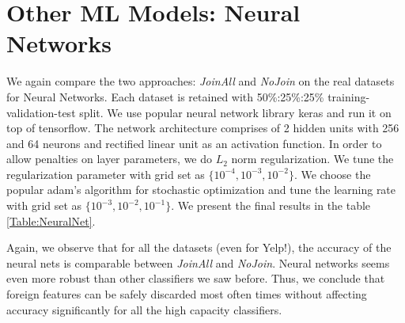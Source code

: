 \documentclass{vldb}
\begin{document}
\section{Other ML Models: Neural Networks}
We again compare the two approaches: \textit{JoinAll} and \textit{NoJoin} on the real datasets for Neural Networks. Each dataset is retained with 50\%:25\%:25\% training-validation-test split. We use popular neural network library keras and run it on top of tensorflow. The network architecture comprises of 2 hidden units with 256 and 64 neurons and rectified linear unit as an activation function. In order to allow penalties on layer parameters, we do $L_2$ norm regularization. We tune the regularization parameter with grid set as $\{ 10^{-4}, 10^{-3}, 10^{-2} \}$. We choose the popular adam's algorithm for stochastic optimization and tune the learning rate with grid set as $\{ 10^{-3}, 10^{-2}, 10^{-1} \}$. We present the final results in the table \ref{Table:NeuralNet}.

Again, we observe that for all the datasets (even for Yelp!), the accuracy of the neural nets is comparable between \textit{JoinAll} and \textit{NoJoin}. Neural networks seems even more robust than other classifiers we saw before. Thus, we conclude that foreign features can be safely discarded most often times without affecting accuracy significantly for all the high capacity classifiers.




\end{document}
